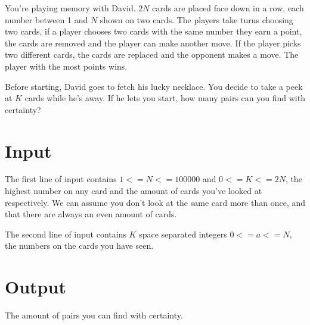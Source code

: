 You're playing memory with David. $2N$ cards are placed face down in a row, each number between 1 and $N$ shown on two cards. The players take turns choosing two cards, if a player chooses two cards with the same number they earn a point, the cards are removed and the player can make another move. If the player picks two different cards, the cards are replaced and the opponent makes a move. The player with the most points wins. 

Before starting, David goes to fetch his lucky necklace. You decide to take a peek at $K$ cards while he's away. If he lets you start, how many pairs can you find with certainty?

\section*{Input}

The first line of input contains $1<=N<=100000$ and $0<=K<=2N$, the highest number on any card and the amount of cards you've looked at respectively. We can assume you don't look at the same card more than once, and that there are always an even amount of cards.

The second line of input contains $K$ space separated integers $0<=a<=N$, the numbers on the cards you have seen. 

\section*{Output}

The amount of pairs you can find with certainty. 